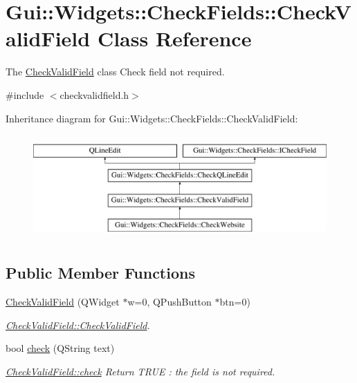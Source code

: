 \hypertarget{classGui_1_1Widgets_1_1CheckFields_1_1CheckValidField}{}\section{Gui\+:\+:Widgets\+:\+:Check\+Fields\+:\+:Check\+Valid\+Field Class Reference}
\label{classGui_1_1Widgets_1_1CheckFields_1_1CheckValidField}


The \hyperlink{classGui_1_1Widgets_1_1CheckFields_1_1CheckValidField}{Check\+Valid\+Field} class Check field not required.  




{\ttfamily \#include $<$checkvalidfield.\+h$>$}

Inheritance diagram for Gui\+:\+:Widgets\+:\+:Check\+Fields\+:\+:Check\+Valid\+Field\+:\begin{figure}[H]
\begin{center}
\leavevmode
\includegraphics[height=4.000000cm]{d8/d6d/classGui_1_1Widgets_1_1CheckFields_1_1CheckValidField}
\end{center}
\end{figure}
\subsection*{Public Member Functions}
\begin{DoxyCompactItemize}
\item 
\hyperlink{classGui_1_1Widgets_1_1CheckFields_1_1CheckValidField_a17f7b1d7ce52fb9112a0f60fa0d4f572}{Check\+Valid\+Field} (Q\+Widget $\ast$w=0, Q\+Push\+Button $\ast$btn=0)
\begin{DoxyCompactList}\small\item\em \hyperlink{classGui_1_1Widgets_1_1CheckFields_1_1CheckValidField_a17f7b1d7ce52fb9112a0f60fa0d4f572}{Check\+Valid\+Field\+::\+Check\+Valid\+Field}. \end{DoxyCompactList}\item 
bool \hyperlink{classGui_1_1Widgets_1_1CheckFields_1_1CheckValidField_a871d7b28becd80aac9fc75a2057bb15d}{check} (Q\+String text)
\begin{DoxyCompactList}\small\item\em \hyperlink{classGui_1_1Widgets_1_1CheckFields_1_1CheckValidField_a871d7b28becd80aac9fc75a2057bb15d}{Check\+Valid\+Field\+::check} Return T\+R\+U\+E \+: the field is not required. \end{DoxyCompactList}\end{DoxyCompactItemize}
